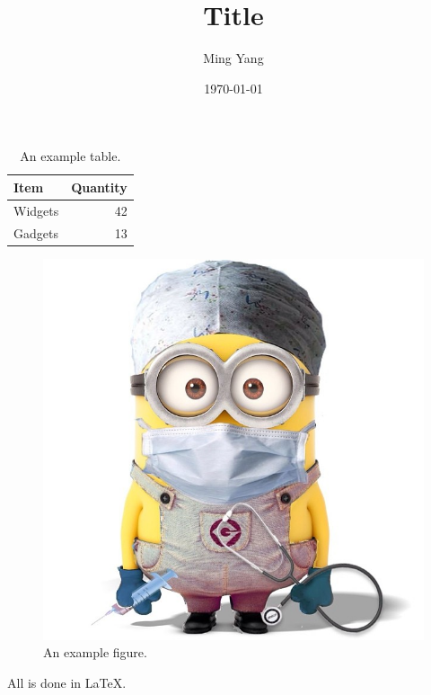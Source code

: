 \documentclass{article}
\begin{document}
\title{\textsf{Title}}
\author{Ming Yang}
\date{\today}
\maketitle



\begin{table}[H]
\centering
\begin{tabular}{l|r}
Item & Quantity \\\hline
Widgets & 42 \\
Gadgets & 13
\end{tabular}
\caption{\label{tab:widgets}An example table.}
\end{table}


\begin{figure}[H]
\begin{center}
\includegraphics[scale=0.2]{figure.jpg}
\caption{An example figure.}
\end{center}
\end{figure}


All is done in \LaTeX \cite{knuth1986texbook}.



\end{document}
